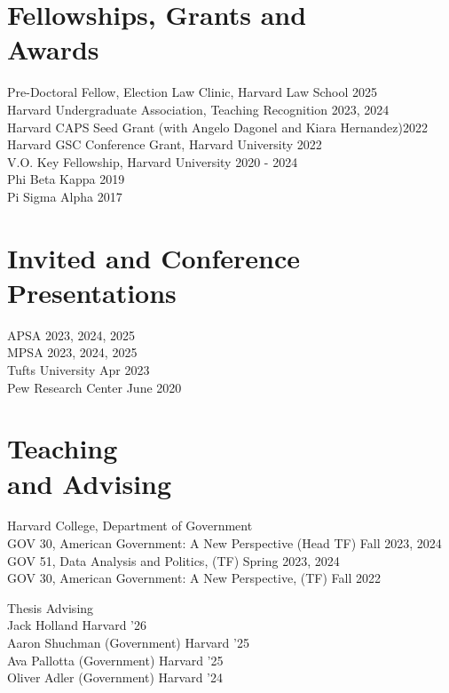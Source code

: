 \documentclass[margin, line]{res}
\begin{document}
\begin{resume}
\section{Fellowships, Grants and \\Awards}
Pre-Doctoral Fellow, Election Law Clinic, Harvard Law School \hfill 2025\\
Harvard Undergraduate Association, Teaching Recognition \hfill 2023, 2024\\
Harvard CAPS Seed Grant (with Angelo Dagonel and Kiara Hernandez)\hfill 2022\\
Harvard GSC Conference Grant, Harvard University \hfill 2022\\
V.O. Key Fellowship, Harvard University \hfill 2020 - 2024\\
Phi Beta Kappa \hfill 2019\\
Pi Sigma Alpha \hfill 2017

\section{Invited and Conference Presentations}
APSA \hfill 2023, 2024, 2025\\
MPSA \hfill 2023, 2024, 2025\\
Tufts University \hfill Apr 2023\\
Pew Research Center  \hfill June 2020

\section{Teaching \\and Advising}
Harvard College, Department of Government\\
\hspace*{5mm} GOV 30, American Government: A New Perspective (Head TF) \hfill Fall 2023, 2024\\
\hspace*{5mm} GOV 51, Data Analysis and Politics, (TF) \hfill Spring 2023, 2024\\
\hspace*{5mm} GOV 30, American Government: A New Perspective,  (TF) \hfill Fall 2022

\hspace*{2.5mm} Thesis Advising \\
\hspace*{5mm} Jack Holland \hfill Harvard '26\\
\hspace*{5mm} Aaron Shuchman (Government) \hfill Harvard '25\\
\hspace*{5mm} Ava Pallotta (Government) \hfill Harvard '25\\
\hspace*{5mm} Oliver Adler (Government) \hfill Harvard '24


\end{resume}
\end{document}
